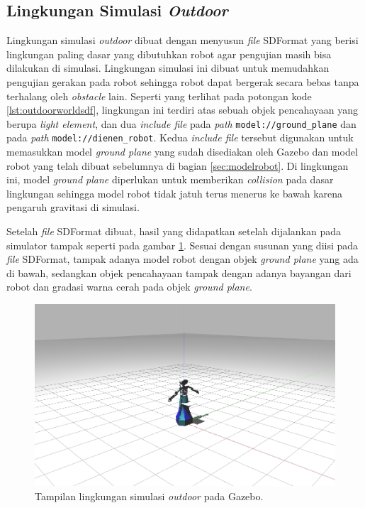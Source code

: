 \subsection{Lingkungan Simulasi \emph{Outdoor}}
\label{subsec:lingkunganoutdoor}

Lingkungan simulasi \emph{outdoor} dibuat dengan menyusun \emph{file} SDFormat yang berisi lingkungan paling dasar yang dibutuhkan robot agar pengujian masih bisa dilakukan di simulasi.
Lingkungan simulasi ini dibuat untuk memudahkan pengujian gerakan pada robot sehingga robot dapat bergerak secara bebas tanpa terhalang oleh \emph{obstacle} lain.
Seperti yang terlihat pada potongan kode \ref{lst:outdoorworldsdf},
  lingkungan ini terdiri atas sebuah objek pencahayaan yang berupa \emph{light element},
  dan dua \emph{include file} pada \emph{path} \lstinline{model://ground_plane} dan pada \emph{path} \lstinline{model://dienen_robot}.
Kedua \emph{include file} tersebut digunakan untuk memasukkan model \emph{ground plane} yang sudah disediakan oleh Gazebo dan model robot yang telah dibuat sebelumnya di bagian \ref{sec:modelrobot}.
Di lingkungan ini, model \emph{ground plane} diperlukan untuk memberikan \emph{collision} pada dasar lingkungan sehingga model robot tidak jatuh terus menerus ke bawah karena pengaruh gravitasi di simulasi.



Setelah \emph{file} SDFormat dibuat,
  hasil yang didapatkan setelah dijalankan pada simulator tampak seperti pada gambar \ref{fig:lingkunganoutdoor}.
Sesuai dengan susunan yang diisi pada \emph{file} SDFormat,
  tampak adanya model robot dengan objek \emph{ground plane} yang ada di bawah,
  sedangkan objek pencahayaan tampak dengan adanya bayangan dari robot dan gradasi warna cerah pada objek \emph{ground plane}.

\begin{figure} [ht]
  \centering
  \includegraphics[scale=0.23]{gambar/lingkungan-outdoor.png}
  \caption{Tampilan lingkungan simulasi \emph{outdoor} pada Gazebo.}
  \label{fig:lingkunganoutdoor}
\end{figure}
